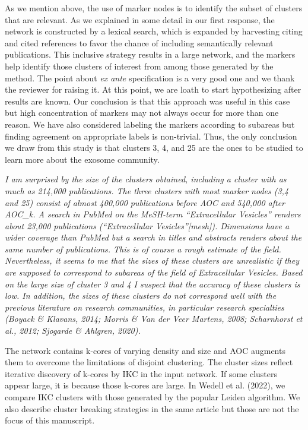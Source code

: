 \documentclass[11pt, oneside]{article}   	%
\begin{document}
\vspace{2 mm}  
As we mention above, the use of marker nodes is to identify the subset of clusters that are relevant. As we explained in some detail in our first response, the network is constructed by a lexical search, which is expanded by harvesting citing and cited references to favor the chance of including semantically relevant publications. This inclusive strategy results in a large network, and the markers help identify those clusters of interest from among those generated by the method. The point about \emph{ex ante} specification is a very good one and we thank the reviewer for raising it. At this point, we are loath to start hypothesizing after results are known. Our conclusion is that this approach was useful in this case but high concentration of markers may not always occur for more than one reason. We have also considered labeling the markers according to subareas but finding agreement on appropriate labels is non-trivial. Thus, the only conclusion we draw from this study is that clusters 3, 4, and 25 are the ones to be studied to learn more about the exosome community. 

\vspace{2 mm}  
\emph{ I am surprised by the size of the clusters obtained, including a cluster with as much as 214,000 publications. The three clusters with most marker nodes (3,4 and 25) consist of almost 400,000 publications before AOC and 540,000 after AOC\_k. A search in PubMed on the MeSH-term “Extracellular Vesicles” renders about 23,000 publications (“Extracellular Vesicles”[mesh]). Dimensions have a wider coverage than PubMed but a search in titles and abstracts renders about the same number of publications. This is of course a rough estimate of the field. Nevertheless, it seems to me that the sizes of these clusters are unrealistic if they are supposed to correspond to subareas of the field of Extracellular Vesicles. Based on the large size of cluster 3 and 4 I suspect that the accuracy of these clusters is low. In addition, the sizes of these clusters do not correspond well with the previous literature on research communities, in particular research specialties (Boyack \& Klavans, 2014; Morris \& Van der Veer Martens, 2008; Scharnhorst et al., 2012; Sjogarde \& Ahlgren, 2020).}

\vspace{2 mm} 
The network contains k-cores of varying density and size and AOC augments them to overcome the limitations of disjoint clustering. The cluster sizes reflect iterative discovery of k-cores by IKC in the input network. If some clusters appear large, it is because those k-cores are large. In Wedell et al. (2022), we compare IKC clusters with those generated by the popular Leiden algorithm. We also describe cluster breaking strategies in the same article but those are not the focus of this manuscript.
\end{document}
